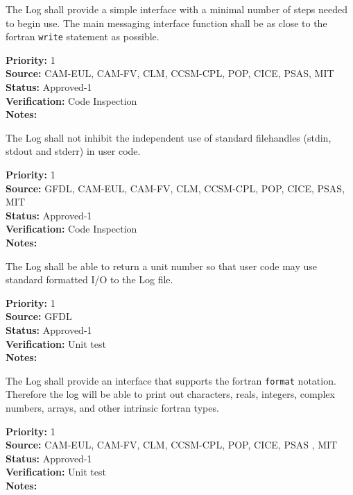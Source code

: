 
The Log shall provide a simple interface with a minimal number of
steps needed to begin use.  The main messaging interface function shall be as
close to the fortran {\tt write} statement as possible.

\begin{reqlist}
{\bf Priority:} 1 \\
{\bf Source:} CAM-EUL, CAM-FV, CLM, CCSM-CPL, POP, CICE, PSAS, MIT  \\
{\bf Status:} Approved-1 \\
{\bf Verification:} Code Inspection \\
{\bf Notes:} 
\end{reqlist}


The Log shall not inhibit the independent use of standard filehandles
(stdin, stdout and stderr) in user code.

\begin{reqlist}
{\bf Priority:} 1 \\
{\bf Source:} GFDL, CAM-EUL, CAM-FV, CLM, CCSM-CPL, POP, CICE, PSAS, MIT  \\
{\bf Status:} Approved-1 \\
{\bf Verification:} Code Inspection \\
{\bf Notes:} 
\end{reqlist}


The Log shall be able to return a unit number so that user code may use 
standard formatted I/O to the Log file.

\begin{reqlist}
{\bf Priority:} 1 \\
{\bf Source:} GFDL \\
{\bf Status:} Approved-1 \\
{\bf Verification:} Unit test \\
{\bf Notes:} 
\end{reqlist}


The Log shall provide an interface that supports the fortran {\tt format} 
notation.  Therefore the log will be able to print out characters, reals, 
integers, complex numbers, arrays, and other intrinsic fortran types.

\begin{reqlist}
{\bf Priority:} 1 \\
{\bf Source:} CAM-EUL, CAM-FV, CLM, CCSM-CPL, POP, CICE, PSAS , MIT \\
{\bf Status:} Approved-1 \\
{\bf Verification:} Unit test \\
{\bf Notes:} 
\end{reqlist}

